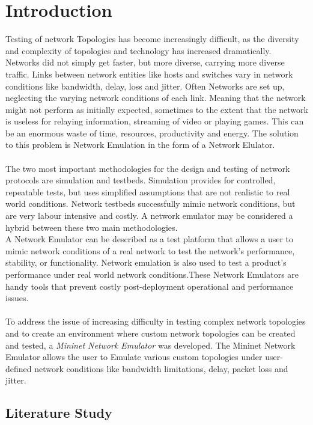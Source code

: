 \graphicspath{ {GUI/} }
\chapter{Introduction}
Testing of network Topologies has become increasingly difficult, as the diversity and complexity of topologies and technology has increased dramatically. Networks did not simply get faster, but more diverse, carrying more diverse traffic. Links between network entities like hosts and switches vary in network conditions like bandwidth, delay, loss and jitter. Often Networks are set up, neglecting the varying network conditions of each link. Meaning that the network might not perform as initially expected, sometimes to the extent that the network is useless for relaying information, streaming of video or playing games. This can be an enormous waste of time, resources, productivity and energy. The solution to this problem is Network Emulation in the form of a Network Elulator.\\\\
The two most important methodologies  for the design and testing of network protocols are simulation and testbeds. Simulation provides for controlled, repeatable tests, but uses simplified assumptions that are not realistic to real world conditions. Network testbeds successfully mimic network conditions, but are very labour intensive and costly. A network emulator may be considered a hybrid between these two main methodologies.\\A Network Emulator can be described as a test platform that allows a user to mimic network conditions of a real network to test the network's performance, stability, or functionality. Network emulation is also used to test a product's performance under real world network conditions.These Network Emulators are handy tools that prevent costly post-deployment operational and performance issues.\\\\
To address the issue of increasing difficulty in testing complex network topologies and to create an environment where custom network topologies can be created and tested, a \textit{Mininet Network Emulator} was developed. The Mininet Network Emulator allows the user to Emulate various custom topologies under user-defined network conditions like bandwidth limitations, delay, packet loss and jitter.

\section{Literature Study}

